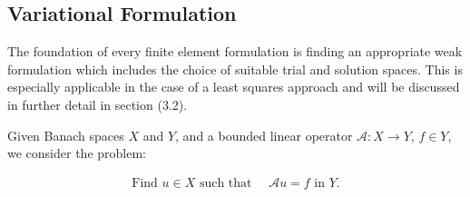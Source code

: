 \documentclass[../draft_1.tex]{subfiles}
\begin{document}

\subsection{Variational Formulation}

The foundation of every finite element formulation is finding an appropriate weak formulation which includes the choice of suitable trial and solution spaces. This is especially applicable in the case of a least squares approach and will be discussed in further detail in section (3.2). 

Given Banach spaces $X$ and $Y$, and a bounded linear operator $\mathcal{A} : X \rightarrow Y$, $f \in Y$, we consider the problem:
\begin{ceqn}
\begin{align}
\label{basic_strong_form}
\text{Find } u \in X \text{ such that } \quad \mathcal{A} u = f \text{ in } Y.
\end{align}
\end{ceqn}
\end{document}
